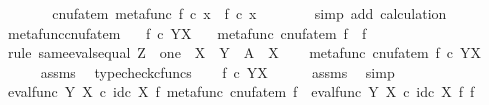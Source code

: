 \begin{isabellebody}
\ \ \ \ \isamarkupfalse%
\ \isamarkupfalse%
\ {\isachardoublequoteopen}cnufatem\ {\isacharparenleft}{\kern0pt}metafunc\ f{\isacharparenright}{\kern0pt}\ {\isasymcirc}\isactrlsub c\ x\ {\isacharequal}{\kern0pt}\ f\ {\isasymcirc}\isactrlsub c\ x{\isachardoublequoteclose}\isanewline
\ \ \ \ \ \ \isamarkupfalse%
\ {\isacharparenleft}{\kern0pt}simp\ add{\isacharcolon}{\kern0pt}\ calculation{\isacharparenright}{\kern0pt}\isanewline
\ \ \isamarkupfalse%
\isanewline
{}\isamarkupfalse%
%
\endisatagproof
{\isafoldproof}%
%
\isadelimproof
\isanewline
%
\endisadelimproof
\isanewline
{}\isamarkupfalse%
\ metafunc{\isacharunderscore}{\kern0pt}cnufatem{\isacharcolon}{\kern0pt}\isanewline
\ \ \ {\isachardoublequoteopen}f\ {\isasymin}\isactrlsub c\ Y\isactrlbsup X\isactrlesup {\isachardoublequoteclose}\isanewline
\ \ \ {\isachardoublequoteopen}metafunc\ {\isacharparenleft}{\kern0pt}cnufatem\ f{\isacharparenright}{\kern0pt}\ {\isacharequal}{\kern0pt}\ f{\isachardoublequoteclose}\isanewline
%
\isadelimproof
%
\endisadelimproof
%
\isatagproof
{}\isamarkupfalse%
\ {\isacharparenleft}{\kern0pt}rule\ same{\isacharunderscore}{\kern0pt}evals{\isacharunderscore}{\kern0pt}equal{\isacharbrackleft}{\kern0pt}\ Z\ {\isacharequal}{\kern0pt}\ one{\isacharcomma}{\kern0pt}\ \ X\ {\isacharequal}{\kern0pt}\ Y{\isacharcomma}{\kern0pt}\ \ A\ {\isacharequal}{\kern0pt}\ X{\isacharbrackright}{\kern0pt}{\isacharparenright}{\kern0pt}\isanewline
\ \ \isamarkupfalse%
\ {\isachardoublequoteopen}metafunc\ {\isacharparenleft}{\kern0pt}cnufatem\ f{\isacharparenright}{\kern0pt}\ {\isasymin}\isactrlsub c\ Y\isactrlbsup X\isactrlesup {\isachardoublequoteclose}\isanewline
\ \ \ \ \isamarkupfalse%
\ assms\ \isamarkupfalse%
\ typecheck{\isacharunderscore}{\kern0pt}cfuncs\isanewline
\ \ \isamarkupfalse%
\ {\isachardoublequoteopen}f\ {\isasymin}\isactrlsub c\ Y\isactrlbsup X\isactrlesup {\isachardoublequoteclose}\isanewline
\ \ \ \ \isamarkupfalse%
\ assms\ \isamarkupfalse%
\ simp\ \isanewline
\ \ \isamarkupfalse%
\ {\isachardoublequoteopen}eval{\isacharunderscore}{\kern0pt}func\ Y\ X\ {\isasymcirc}\isactrlsub c\ {\isacharparenleft}{\kern0pt}id\isactrlsub c\ X\ {\isasymtimes}\isactrlsub f\ {\isacharparenleft}{\kern0pt}metafunc\ {\isacharparenleft}{\kern0pt}cnufatem\ f{\isacharparenright}{\kern0pt}{\isacharparenright}{\kern0pt}{\isacharparenright}{\kern0pt}\ {\isacharequal}{\kern0pt}\ eval{\isacharunderscore}{\kern0pt}func\ Y\ X\ {\isasymcirc}\isactrlsub c\ id\isactrlsub c\ X\ {\isasymtimes}\isactrlsub f\ f{\isachardoublequoteclose}\isanewline

\end{isabellebody}
